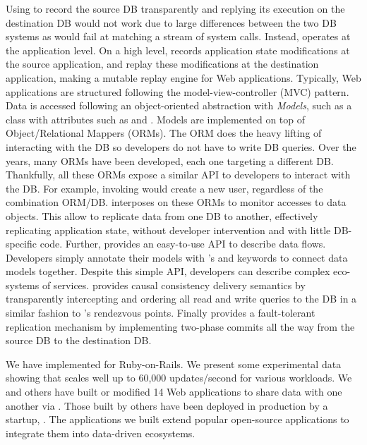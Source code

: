 Using \dora to record the source DB transparently and replying its execution on
the destination DB would not work due to large differences between the two DB systems
as \dora would fail at matching a stream of system calls.
Instead, \synapse operates at the application level.
On a high level, \synapse records application state modifications at the source
application, and replay these modifications at the destination application,
making \synapse a mutable replay engine for Web applications.
Typically, Web applications are structured following
the model-view-controller (MVC) pattern. Data is accessed following an object-oriented
abstraction with {\em Models}, such as a  class with attributes such
as  and . Models are implemented on top of
Object/Relational Mappers (ORMs).
The ORM does the heavy lifting of interacting with the DB so developers
do not have to write DB queries. Over the years, many ORMs have been developed,
each one targeting a different DB. Thankfully, all these ORMs expose a similar API
to developers to interact with the DB. For example, invoking
 would create a new user, regardless of the combination
ORM/DB.  \synapse interposes on these ORMs to monitor accesses to data objects.
This allow \synapse to replicate data from
one DB to another, effectively replicating application state,
without developer intervention and with little DB-specific code.
Further, \synapse provides an easy-to-use API to describe data flows. Developers simply
annotate their models with \synapse's  and 
keywords to connect data models together.
Despite this simple API, developers can describe complex eco-systems
of services. \synapse provides causal consistency delivery semantics by
transparently intercepting and ordering all read and write queries to the DB in
a similar fashion to \scribe's rendezvous points. Finally \synapse provides
a fault-tolerant replication mechanism by implementing two-phase commits all
the way from the source DB to the destination DB.

We have implemented \synapse for Ruby-on-Rails. We present some experimental
data showing that \synapse scales well up to 60,000 updates/second for various
workloads.  We and others have built or modified 14 Web applications to share
data with one another via \synapse. Those built by others have been deployed in
production by a startup, \crowdtap.  The applications we built extend popular
open-source applications to integrate them into data-driven ecosystems.
